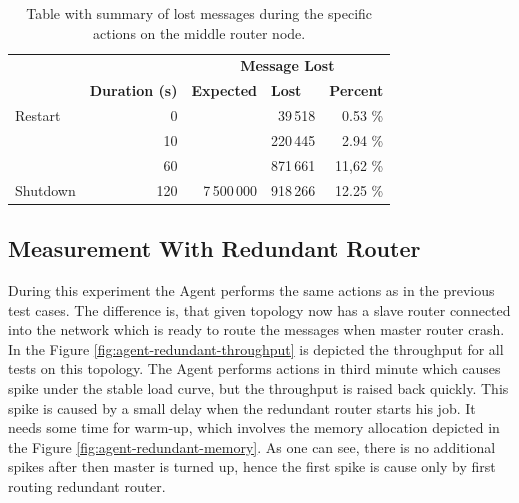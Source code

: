 \begingroup
\setlength{\tabcolsep}{10pt} %
\renewcommand{\arraystretch}{1.35} %
	\begin{table}[H]
	\centering
	\caption{Table with summary of lost messages during the specific actions on the middle router node.}
	\label{tab:agent_demonstration}
	\begin{tabular}{|l|r|r|r|r|}
	\hline
	\rowcolor[HTML]{C5E3DF}
	\cellcolor[HTML]{C5E3DF} & \multicolumn{1}{c|}{\cellcolor[HTML]{C5E3DF}} & \multicolumn{3}{c|}{\cellcolor[HTML]{C5E3DF}\textbf{Message Lost}} \\ \cline{3-5}
	\rowcolor[HTML]{C5E3DF}
	\multirow{-2}{*}{\cellcolor[HTML]{C5E3DF}\textbf{Action}} & \multicolumn{1}{c|}{\multirow{-2}{*}{\cellcolor[HTML]{C5E3DF}\textbf{Duration (s)}}} & \multicolumn{1}{l|}{\cellcolor[HTML]{C5E3DF}\textbf{Expected}} & \multicolumn{1}{l|}{\cellcolor[HTML]{C5E3DF}\textbf{Lost}} & \multicolumn{1}{l|}{\cellcolor[HTML]{C5E3DF}\textbf{Percent}} \\ \hline
	Restart & 0 & & 39\,518 & 0.53 \% \\ \cline{1-2} \cline{4-5}
	 & 10 & & 220\,445 & 2.94 \% \\ \cline{2-2} \cline{4-5}
	 & 60 & & 871\,661 & 11,62 \% \\ \cline{2-2} \cline{4-5}
	\multirow{-3}{*}{Shutdown} & 120 & \multirow{-4}{*}{7\,500\,000} & 918\,266 & 12.25 \% \\ \hline
	\end{tabular}
	\end{table}
\endgroup


\subsection{Measurement With Redundant Router}
During this experiment the Agent performs the same actions as in the previous test cases. The difference is, that given topology now has a slave router connected into the network which is ready to route the messages when master router crash. In the Figure \ref{fig:agent-redundant-throughput} is depicted the throughput for all tests on this topology. The Agent performs actions in third minute which causes spike under the stable load curve, but the throughput is raised back quickly. This spike is caused by a small delay when the redundant router starts his job. It needs some time for warm-up, which involves the memory allocation depicted in the Figure \ref{fig:agent-redundant-memory}. As one can see, there is no additional spikes after then master is turned up, hence the first spike is cause only by first routing redundant router.

